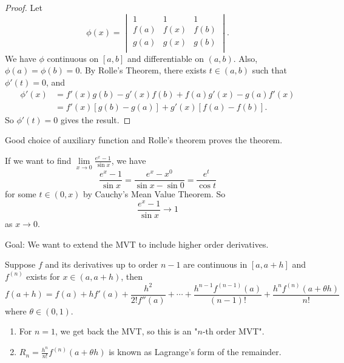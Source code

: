 \begin{proof}
    Let
    \[
        \phi(x) = \begin{vmatrix}
            1 & 1 &  1 \\
            f(a) & f(x) &  f(b) \\
            g(a) & g(x) &  g(b) \\
        \end{vmatrix}.
    \]
    We have \(\phi\) continuous on \([a,b]\) and differentiable on \((a,b)\). Also, \(\phi(a) = \phi(b) = 0\). By Rolle's Theorem, there exists \(t \in (a,b)\) such that \(\phi'(t) = 0\), and
    \begin{align*}
        \phi'(x) &= f'(x)g(b) - g'(x)f(b)+f(a)g'(x)-g(a)f'(x)\\
        &= f'(x)[g(b) - g(a)] + g'(x)[f(a) - f(b)].
    \end{align*}
    So \(\phi'(t) = 0\) gives the result.
\end{proof}
\begin{note}
Good choice of auxiliary function and Rolle's theorem proves the theorem.
\end{note}
\begin{example}
    If we want to find \(\lim\limits_{x \to 0} \frac{e^{x}-1}{\sin x}\), we have
    \[
        \frac{e^x - 1}{\sin x} = \frac{e^x - x^0}{\sin x - \sin 0}= \frac{e^t}{\cos t}
    \]
    for some \(t \in (0,x)\) by Cauchy's Mean Value Theorem. So
    \[
        \frac{e^x - 1}{\sin x} \to 1
    \]
    as \(x \to 0\).
\end{example}
Goal: We want to extend the MVT to include higher order derivatives.
\begin{theorem}
    \label{tl}
    Suppose \(f\) and its derivatives up to order \(n - 1\) are continuous in \([a, a + h]\) and \(f^{(n)}\) exists for \(x \in (a, a + h)\), then
    \[
        f(a + h) = f(a) + hf'(a) + \frac{h^2}{2!f''(a)} + \cdots + \frac{h^{n-1}f^{(n-1)}(a)}{(n-1)!} + \frac{h^n f^{(n)}(a + \theta h)}{n!}
    \]
    where \(\theta \in (0,1)\).
\end{theorem}
\begin{note}
    \leavevmode
    \begin{enumerate}
        \item For \(n = 1\), we get back the MVT, so this is an "\(n\)-th order MVT".
        \item \(R_n = \frac{h^n}{n!}f^{(n)}(a + \theta h)\) is known as Lagrange's form of the remainder.
    \end{enumerate}
\end{note}
